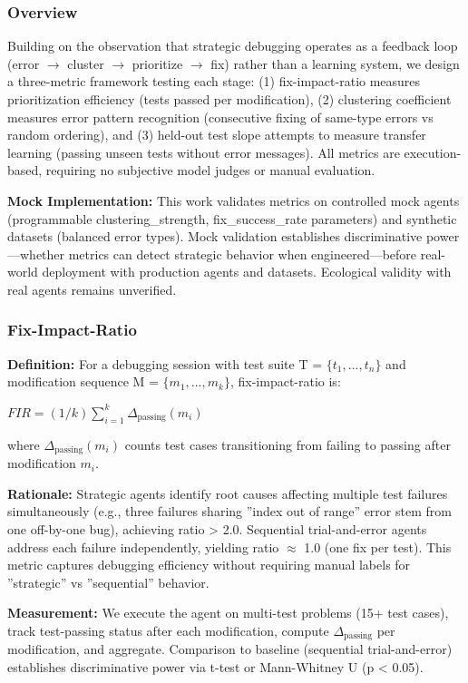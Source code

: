 
\subsubsection{Overview}

Building on the observation that strategic debugging operates as a feedback loop (error $\rightarrow$ cluster $\rightarrow$ prioritize $\rightarrow$ fix) rather than a learning system, we design a three-metric framework testing each stage: (1) fix-impact-ratio measures prioritization efficiency (tests passed per modification), (2) clustering coefficient measures error pattern recognition (consecutive fixing of same-type errors vs random ordering), and (3) held-out test slope attempts to measure transfer learning (passing unseen tests without error messages). All metrics are execution-based, requiring no subjective model judges or manual evaluation.

\textbf{Mock Implementation:} This work validates metrics on controlled mock agents (programmable clustering\_strength, fix\_success\_rate parameters) and synthetic datasets (balanced error types). Mock validation establishes discriminative power---whether metrics can detect strategic behavior when engineered---before real-world deployment with production agents and datasets. Ecological validity with real agents remains unverified.

\subsubsection{Fix-Impact-Ratio}

\textbf{Definition:} For a debugging session with test suite T = $\{t_1, ..., t_n\}$ and modification sequence M = $\{m_1, ..., m_k\}$, fix-impact-ratio is:

$FIR = (1/k) \sum_{i=1}^{k} \Delta_{\text{passing}}(m_i)$

where $\Delta_{\text{passing}}(m_i)$ counts test cases transitioning from failing to passing after modification $m_i$.

\textbf{Rationale:} Strategic agents identify root causes affecting multiple test failures simultaneously (e.g., three failures sharing ''index out of range'' error stem from one off-by-one bug), achieving ratio > 2.0. Sequential trial-and-error agents address each failure independently, yielding ratio $\approx$ 1.0 (one fix per test). This metric captures debugging efficiency without requiring manual labels for ''strategic'' vs ''sequential'' behavior.

\textbf{Measurement:} We execute the agent on multi-test problems (15+ test cases), track test-passing status after each modification, compute $\Delta_{\text{passing}}$ per modification, and aggregate. Comparison to baseline (sequential trial-and-error) establishes discriminative power via t-test or Mann-Whitney U (p < 0.05).

